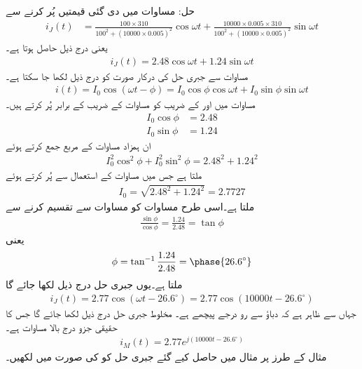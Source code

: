 حل: مساوات  میں دی گئی قیمتیں پُر کرنے سے
\begin{align*}
i_J(t)&=\frac{100\times 310}{100^2+(\num{10000}\times 0.005)^2} \cos \omega t+\frac{\num{10000}\times 0.005\times 310}{100^2+(\num{10000}\times 0.005)^2} \sin \omega t
\end{align*}
یعنی درج ذیل حاصل ہوتا ہے۔
\begin{align}\label{مساوات_بدلتا_جبری_حل_ب}
i_J(t)=2.48\cos \omega t+1.24\sin \omega t
\end{align}
مساوات  سے  جبری حل کی درکار صورت کو درج ذیل لکھا جا سکتا ہے۔ 
\begin{align}\label{مساوات_بدلتا_جبری_حل_پ}
i(t)=I_0 \cos(\omega t-\phi)=I_0 \cos \phi \cos \omega t+I_0 \sin \phi \sin \omega t
\end{align}
مساوات  میں  اور  کے  ضریب  کو مساوات  کے  ضریب  کے برابر پُر کرتے ہیں۔
\begin{align}
I_0 \cos \phi &=2.48 \label{مساوات_بدلتا_جبری_حل_ت}\\
I_0 \sin \phi&=1.24 \label{مساوات_بدلتا_جبری_حل_ٹ}
\end{align}
ان ہمزاد مساوات کے مربع جمع کرتے ہوئے 
\begin{align*}
I_0^2 \cos^2 \phi+I_0^2 \sin^2 \phi=2.48^2+1.24^2
\end{align*}
ملتا ہے جس میں مساوات  کے استعمال سے   پُر کرتے ہوئے
\begin{align*}
I_0=\sqrt{2.48^2+1.24^2}=2.7727
\end{align*}
ملتا ہے۔اسی طرح مساوات  کو مساوات  سے تقسیم کرنے سے
\begin{align*}
\frac{\sin \phi}{\cos \phi}=\frac{1.24}{2.48}=\tan \phi
\end{align*}
یعنی
\begin{align*}
\phi=\tan ^{-1}\frac{1.24}{2.48}=\phase{26.6^{\circ}}
\end{align*}
ملتا ہے۔یوں جبری حل درج ذیل لکھا جائے گا
\begin{align}
i_J(t)=2.77\cos(\omega t-26.6^{\circ})=2.77\cos(\num{10000} t-26.6^{\circ})
\end{align}
جہاں سے ظاہر ہے کہ دباؤ سے رو  درجے پیچھے ہے۔ مخلوط جبری حل درج ذیل لکھا جائے گا جس کا حقیقی جزو درج بالا مساوات ہے۔
\begin{align}\label{مساوات_بدلتا_مخلوط_رو_صورت}
i_M(t)=2.77 e^{j(\num{10000} t-26.6^{\circ})}
\end{align}
مثال  کے طرز پر مثال  میں حاصل کیے گئے جبری حل کو  کی صورت میں لکھیں۔


